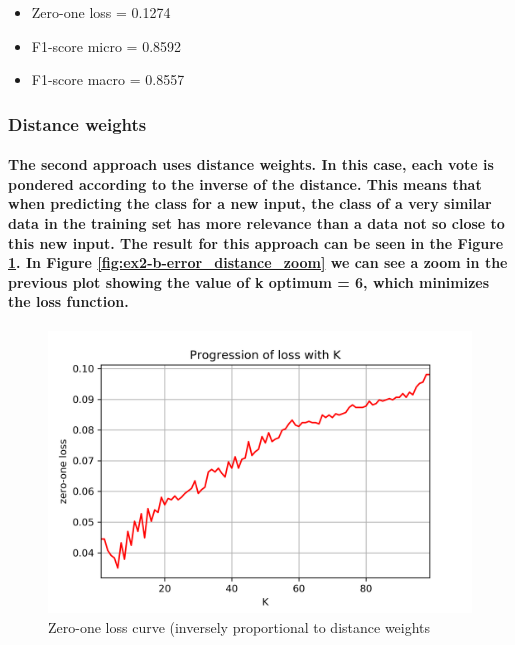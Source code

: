 \documentclass[a4paper]{article}    %
\begin{document}
\begin{itemize}
    \item Zero-one loss = 0.1274
    \item F1-score micro = 0.8592
    \item F1-score macro = 0.8557
\end{itemize}


\subsubsection{Distance weights}

\paragraph{The second approach uses distance weights. In this case, each vote is pondered according to the inverse of the distance. This means that when predicting the class for a new input, the class of a very similar data in the training set has more relevance than a data not so close to this new input. The result for this approach can be seen in the Figure \ref{fig:ex2-b-error_distance}. In Figure \ref{fig:ex2-b-error_distance_zoom} we can see a zoom in the previous plot showing the value of k optimum = 6, which minimizes the loss function.}

\begin{figure}[H]
    \centering
    \includegraphics[width=12cm]{error_distance}
    \caption{Zero-one loss curve (inversely proportional to distance weights}
    \label{fig:ex2-b-error_distance}
\end{figure}
\end{document}
